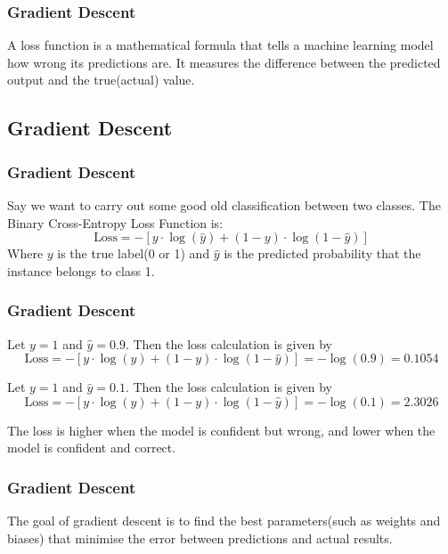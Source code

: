 \documentclass{beamer}
\begin{document}
\begin{frame}
\frametitle{Gradient Descent}
\begin{tcolorbox}
[colback=blue!5!white,colframe=blue!75!black,title= Loss Function]
A loss function is a mathematical formula that tells a machine learning model how wrong its predictions are. It measures the difference between the predicted output and the true(actual) value. 
\end{tcolorbox}
\end{frame}
\begin{frame}
\section{Gradient Descent}
\frametitle{Gradient Descent}
\begin{tcolorbox}
[colback=orange!5!white,colframe=orange!75!black,title= An Example of a Loss Function]
Say we want to carry out some good old classification between two classes. The Binary Cross-Entropy Loss Function is:
$$\text{Loss}=-[y\cdot\log(\hat y)+(1-y)\cdot\log(1-\hat y)]$$
Where $y$ is the true label(0 or 1) and $\hat y$ is the predicted probability that the instance belongs to class 1.
\end{tcolorbox}
\end{frame}
\begin{frame}
\frametitle{Gradient Descent}
\begin{tcolorbox}
[colback=orange!5!white,colframe=orange!75!black,title=Example Calculation 1]
Let $y=1$ and $\hat y=0.9$. Then the loss calculation is given by
$$\text{Loss}=-[y\cdot\log(\hat y)+(1-y)\cdot\log(1-\hat y)]=-\log(0.9)=0.1054$$
\end{tcolorbox}
\begin{tcolorbox}
[colback=orange!5!white,colframe=orange!75!black,title= Example Calculation 2]
Let $y=1$ and $\hat y=0.1$. Then the loss calculation is given by
$$\text{Loss}=-[y\cdot\log(\hat y)+(1-y)\cdot\log(1-\hat y)]=-\log(0.1)=2.3026$$
\end{tcolorbox}
The loss is higher when the model is confident but wrong, and lower when the model is confident and correct.
\end{frame}
\begin{frame}
\frametitle{Gradient Descent}
\begin{tcolorbox}
[colback=blue!5!white,colframe=blue!75!black,title={Goal of Gradient Descent}]
The goal of gradient descent is to find the best parameters(such as weights and biases) that minimise the error between predictions and actual results.
\end{tcolorbox}
\end{frame}
\end{document}
